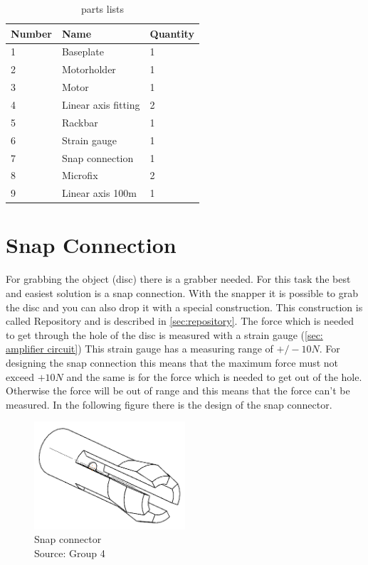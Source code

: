 \documentclass[a4paper,12pt]{scrreprt}
\begin{document}
\begin{table}[H]
\centering
\begin{tabular}{|l|l|l|}
\hline
Number & Name                & Quantity \\ \hline
1      & Baseplate           & 1        \\ \hline
2      & Motorholder         & 1        \\ \hline
3      & Motor               & 1        \\ \hline
4      & Linear axis fitting & 2        \\ \hline
5      & Rackbar             & 1        \\ \hline
6      & Strain gauge        & 1        \\ \hline
7      & Snap connection     & 1        \\ \hline
8      & Microfix            & 2        \\ \hline
9      & Linear axis 100m    & 1        \\ \hline
\end{tabular}
\caption{parts lists}
\label{tab:Parts lists}
\end{table}
     
\section{Snap Connection}

For grabbing the object (disc) there is a grabber needed. For this task the best and easiest solution is a snap connection. With the snapper it is possible to grab the disc and you can also drop it with a special construction. This construction is called \acs{Repository} and is described in \autoref{sec:repository}. The force which is needed to get through the hole of the disc is measured with a strain gauge (\autoref{sec: amplifier circuit}) This strain gauge has a measuring range of $+/- 10N$. For designing the snap connection this means that the maximum force must not exceed $+10N$ and the same is for the force which is needed to get out of the hole. Otherwise the force will be out of range and this means that the force can't be measured. In the following figure there is the design of the snap connector.

 \begin{figure}[H]
  \centering
   \includegraphics[width=0.5\textwidth]{pictures/Snap1}
   \caption[Snap connector]{Snap connector\\
	Source: Group 4  
  }
   \label{fig:snap connector}
\end{figure} 
\end{document}
